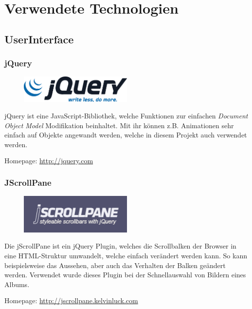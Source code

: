 \chapter{Verwendete Technologien}
\section{UserInterface}
\subsection{jQuery}
\begin{figure}[h]
  \centering
  \includegraphics[width=0.5\textwidth]{images/jQuery_logo.pdf}
\end{figure}
jQuery ist eine JavaScript-Bibliothek, welche Funktionen zur einfachen \textit{Document Object Model} Modifikation beinhaltet. Mit ihr können z.B. Animationen sehr einfach auf Objekte angewandt werden, welche in diesem Projekt auch verwendet werden.

Homepage: \url{http://jquery.com}

\subsection{JScrollPane}
\begin{figure}[h]
  \centering
  \includegraphics[width=0.5\textwidth]{images/jScrollPane_logo.png}
\end{figure}
Die jScrollPane ist ein jQuery Plugin, welches die Scrollbalken der Browser in eine HTML-Struktur umwandelt, welche einfach verändert werden kann. So kann beispielsweise das Aussehen, aber auch das Verhalten der Balken geändert werden. Verwendet wurde dieses Plugin bei der Schnellauswahl von Bildern eines Albums.

Homepage: \url{http://jscrollpane.kelvinluck.com}

